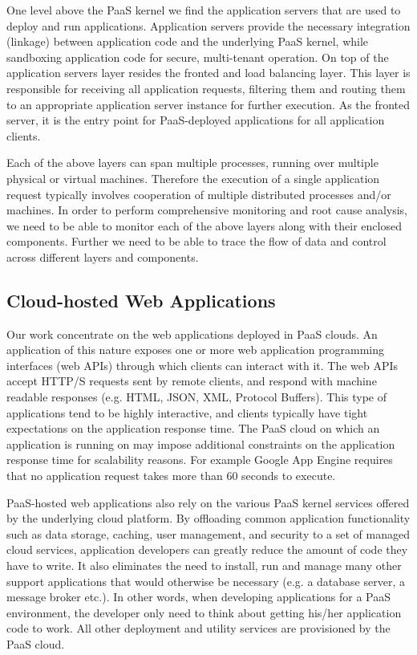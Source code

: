 One level above the PaaS kernel we find the application servers that are used to deploy and run
applications. Application servers provide the necessary integration (linkage) between application code and the
underlying PaaS kernel, while sandboxing application code for secure, multi-tenant operation. On top
of the application servers layer resides the fronted and load balancing layer. This layer is responsible
for receiving all application requests, filtering them and routing them to an appropriate application
server instance for further execution. As the fronted server, it is the entry point for PaaS-deployed
applications for all application clients.

Each of the above layers can span multiple processes, running over multiple physical or virtual
machines. Therefore the execution of a single application request typically involves cooperation
of multiple distributed processes and/or machines. In order to perform comprehensive monitoring
and root cause analysis, we need to be able to monitor each of the above layers along with their
enclosed components. Further we need to be able to trace the flow of data and control
across different layers and components.

\subsection{Cloud-hosted Web Applications}
Our work concentrate on the web applications deployed in PaaS clouds. An application of this nature
exposes one or more web application programming interfaces (web APIs) through which clients can
interact with it. The web APIs accept HTTP/S requests sent by remote clients, and respond with
machine readable responses (e.g. HTML, JSON, XML, Protocol Buffers). This type of applications tend to be highly
interactive, and clients typically have tight expectations on the application response time. The PaaS 
cloud on which an application is running on may impose additional constraints on the application
response time for scalability reasons. For example Google App Engine requires that no application
request takes more than 60 seconds to execute.

PaaS-hosted web applications also rely on the various PaaS kernel services offered by the underlying
cloud platform. By offloading common application functionality such as data storage, caching,
user management, and security to a set of managed cloud services, application developers
can greatly reduce the amount of code they have to write. It also eliminates the need to install, run and
manage many other support applications that would otherwise be necessary (e.g. a database server, 
a message broker etc.). In other words, when developing applications for a PaaS environment, the
developer only need to think about getting his/her application code to work. All other deployment
and utility services are provisioned by the PaaS cloud. 

